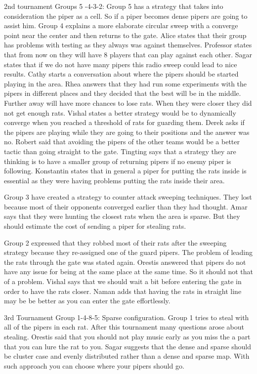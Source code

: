 2nd tournament Groups 5 -4-3-2:
Group 5 has a strategy that takes into consideration the piper as a cell. So if a piper becomes dense pipers are going to assist him.
Group 4 explains a more elaborate circular sweep with a converge point near the center and then returns to the gate.
Alice states that their group has problems with testing as they always was against themselves.
Professor states that from now on they will have 8 players that can play against each other.
Sagar states that if we do not have many pipers this radio sweep could lead to nice results.
Cathy starts a conversation about where the pipers should be started playing in the area.
Rhea answers that they had run some experiments with the pipers in different places and they decided that the best will be in the middle. Further away will have more chances to lose rats. When they were closer they did not get enough rats. 
Vishal states a better strategy would be to dynamically converge when you reached a threshold of rats for guarding them.
Derek asks if the pipers are playing while they are going to their positions and the answer was no.
Robert said that avoiding the pipers of the other teams would be a better tactic than going straight to the gate.
Tingting says that a strategy they are thinking is to have a smaller group of returning pipers if no enemy piper is following.
Konstantin states that in general a piper for putting the rats inside is essential as they were having problems putting the rats inside their area.

Group 3 have created a strategy to counter attack sweeping techniques. They lost because most of their opponents converged earlier than they had thought.
Amar says that they were hunting the closest rats when the area is sparse. But they should estimate the cost of sending a piper for stealing rats.

Group 2 expressed that they robbed most of their rats after the sweeping strategy because they re-assigned one of the guard pipers. 
The problem of leading the rats through the gate was stated again. Orestis answered that pipers do not have any issue for being at the same place at the same time. So it should not that of a problem.
Vishal says that we should wait a bit before entering the gate in order to have the rats closer.
Naman adds that having the rats in straight line may be be better as you can enter the gate effortlessly.

3rd Tournament Group 1-4-8-5:
Sparse configuration.
Group 1 tries to steal with all of the pipers in each rat.
After this tournament many questions arose about stealing. Orestis said that you should not play music early as you miss the a part that you can lure the rat to you.
Sagar suggests that the dense and sparse should be cluster case and evenly distributed rather than a dense and sparse map. With such approach you can choose where your pipers should go. 

